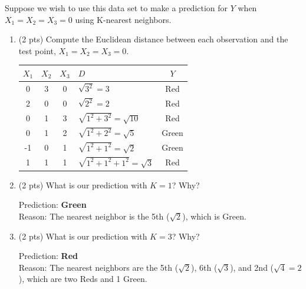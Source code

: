 \documentclass[a4paper]{article}
\theoremstyle{definition}
\newenvironment{soln}{
    \leavevmode\color{blue}\ignorespaces
}{}
\begin{document}
\begin{enumerate}
	      Suppose we wish to use this data set to make a prediction for $Y$ when $X_{1} = X_{2} = X_{3} = 0$ using K-nearest neighbors.

	      \begin{enumerate}
		      \item (2 pts) Compute the Euclidean distance between each observation and the test point, $X_{1} = X_{2} = X_{3}=0$.

		            \begin{center}
			            \begin{tabular}{c c c s c}
				            \hline
				            $X_{1}$ & $X_{2}$ & $X_{3}$ & $D$                                 & $Y$   \\        & 3       & 0       & $\sqrt{3^2} = 3$                    & Red   \\
				            2       & 0       & 0       & $\sqrt{2^2} = 2$                    & Red   \\
				            0       & 1       & 3       & $\sqrt{1^2 + 3^2} = \sqrt{10}$      & Red   \\
				            0       & 1       & 2       & $\sqrt{1^2 + 2^2} = \sqrt{5}$       & Green \\
				            -1      & 0       & 1       & $\sqrt{1^2 + 1^2} = \sqrt{2}$       & Green \\
				            1       & 1       & 1       & $\sqrt{1^2 + 1^2 + 1^2} = \sqrt{3}$ & Red   \\
				            \hline
			            \end{tabular}
		            \end{center}

		      \item (2 pts) What is our prediction with $K=1$? Why?

		            \begin{soln}
			            Prediction: \textbf{Green} \\
			            Reason: The nearest neighbor is the 5th ($\sqrt{2}$), which is Green.
		            \end{soln}

		      \item (2 pts) What is our prediction with $K=3$? Why?

		            \begin{soln}
			            Prediction: \textbf{Red} \\
			            Reason: The nearest neighbors are the 5th ($\sqrt{2}$), 6th ($\sqrt{3}$), and 2nd ($\sqrt{4} = 2$), which are two Reds and 1 Green.
		            \end{soln}


\end{enumerate}
\end{enumerate}
\end{document}
